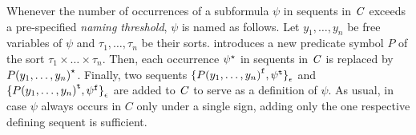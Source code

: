 Whenever the number of occurrences of a subformula $\psi$ in sequents in $\mathit{C}$ exceeds a pre-specified {\it naming threshold}, 
$\psi$ is named as follows. Let $y_1,\ldots,y_n$ be free variables of $\psi$ and $\tau_1,\ldots,\tau_n$ be their sorts.
\newcnf{} introduces a new predicate symbol $P$ of the sort
$\tau_1\times\ldots\times\tau_n$. %
Then, each occurrence ${\psi}^{\star}$ in sequents in $\mathit{C}$ is replaced by ${P(y_1,\ldots,y_n)}^{\star}$.
Finally, two sequents
${\{{P(y_1,\ldots,y_n)}^{\mathtt{f}},{\psi}^{\mathtt{t}}\}}_{\epsilon}$
and
${\{{P(y_1,\ldots,y_n)}^{\mathtt{t}},{\psi}^{\mathtt{f}}\}}_{\epsilon}$
are added to $\mathit{C}$ to serve as a definition of $\psi$. 
As usual, in case $\psi$ always occurs in $C$ only under a single sign, 
adding only the one respective defining sequent is sufficient. 










